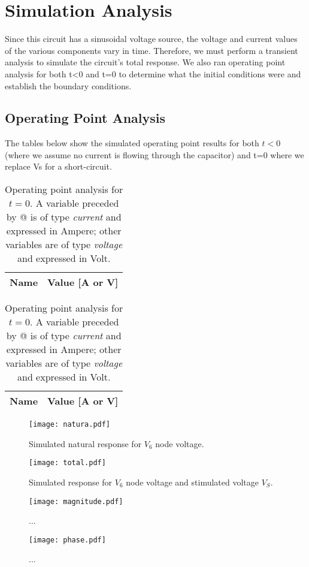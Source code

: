 \section{Simulation Analysis}
\label{sec:simulation}
Since this circuit has a sinusoidal voltage source, the voltage and current values of the various components vary in time. Therefore, we must perform a transient analysis to simulate the circuit's total response. We also ran operating point analysis for both t<0 and t=0 to determine what the initial conditions were and establish the boundary conditions.
\subsection{Operating Point Analysis}
The tables below show the simulated operating point results for both $t<0$ (where we assume no current is flowing through the capacitor) and t=0 where we replace Vs for a short-circuit.
\begin{table}[!htb]
	\begin{minipage}{.5\linewidth}
	\centering
	\begin{tabular}{ll}
	{\bf Name} & {\bf Value [A or V]} \\ \hline
	
	\end{tabular}
	\caption{Operating point analysis for $t<0$. A variable preceded by @ is of type {\em current} other variables are of type {\it voltage} and expressed in Volt.}
  	\end{minipage}
  	\hfill
	\begin{minipage}{.5\linewidth}
	\centering
  	\begin{tabular}{ll}
   	{\bf Name} & {\bf Value [A or V]} \\ \hline
   	
	\end{tabular}
	\caption{Operating point analysis for $t=0$. A variable preceded by @ is of type {\em current} and expressed in Ampere; other variables are of type {\it voltage} and expressed in Volt.}
	\end{minipage}
\end{table}
\par


\begin{figure}[h] \centering
\texttt{[image: natura.pdf]}
\caption{Simulated natural response for $V_{6}$ node voltage.}
\label{fig:natura}
\end{figure}

\begin{figure}[h] \centering
\texttt{[image: total.pdf]}
\caption{Simulated response for $V_{6}$ node voltage and stimulated voltage $V_{S}$.}
\label{fig:total}
\end{figure}

\begin{figure}[h] \centering
\texttt{[image: magnitude.pdf]}
\caption{...}
\label{fig:magnitude}
\end{figure}

\begin{figure}[h] \centering
\texttt{[image: phase.pdf]}
\caption{...}
\label{fig:phase}
\end{figure}
\par
